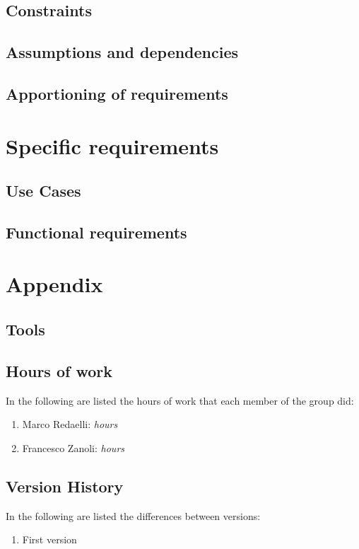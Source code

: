 \documentclass[]{report}
\begin{document}
\section{Constraints}

\section{Assumptions and dependencies}

\section{Apportioning of requirements}

\chapter{Specific requirements}


\section{Use Cases}


\section{Functional requirements}




\appendix
\chapter{Appendix}
\section{Tools}
\newpage
\section{Hours of work}
In the following are listed the hours of work that each member of the group did:
\begin{enumerate}
	\item Marco Redaelli:  \emph{hours}
	\item Francesco Zanoli: \emph{hours}
\end{enumerate}
\newpage
\section{Version History}
In the following are listed the differences between versions:
\begin{enumerate}
	\item First version
\end{enumerate}
\end{document}
